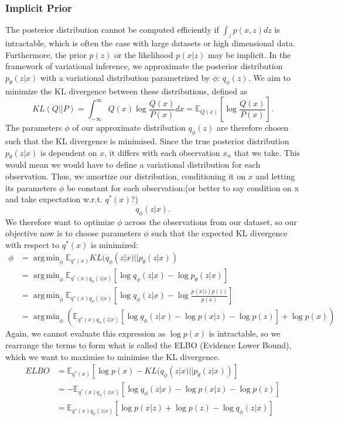 \documentclass[a4paper,12pt]{article}
\DeclareMathOperator*{\argmin}{arg\,min}
\numberwithin{equation}{section}
\begin{document}
\subsubsection{Implicit Prior}
The posterior distribution cannot be computed efficiently if $\int_z p(x,z)dz$ is intractable, which is often the case with large datasets or high dimensional data. Furthermore, the prior $p(z)$ or the likelihood $p(x|z)$ may be implicit. In the framework of variational inference, we approximate the posterior distribution $p_\theta (z|x)$ with a variational distribution parametrized by $\phi$: $q_\phi (z)$. We aim to minimize the KL divergence between these distributions, defined as 
\[KL(Q||P)=\int_{-\infty}^\infty Q(x)\log \frac{Q(x)}{P(x)}dx=\mathbb{E}_{Q(x)}\left[\log\frac{Q(x)}{P(x)}\right].\]
The parameters $\phi$ of our approximate distribution $q_\phi (z)$ are therefore chosen such that the KL divergence is minimised. Since the true posterior distribution $p_\theta(z|x)$ is dependent on $x$, it differs with each observation $x_n$ that we take. This would mean we would have to define a variational distribution for each observation. Thus, we amortize our distribution, conditioning it on $x$ and letting its parameters $\phi$ be constant for each observation:(or better to say condition on x and take expectation w.r.t. $q^*(x)$?)
\[q_\phi(z|x).\]
We therefore want to optimize $\phi$ across the observations from our dataset, so our objective now is to choose parameters $\phi$ such that the expected KL divergence with respect to $q^*(x)$ is minimized:
\begin{align*}
\phi &=\argmin_\phi \mathbb{E}_{q^*(x)}KL(q_\phi(z|x)||p_\theta (z|x))\\
&= \argmin_\phi \mathbb{E}_{q^*(x)q_\phi (z|x)}\left[\log q_\phi(z|x)-\log p_\theta(z|x)\right]\\
&=\argmin_\phi\mathbb{E}_{q^*(x)q_\phi (z|x)}\left[\log q_\phi(z|x)-\log \frac{p(x|z)p(z)}{p(x)}\right]\\
&=\argmin_\phi\left(\mathbb{E}_{q^*(x)q_\phi (z|x)}\left[\log q_\phi(z|x)-\log p(x|z)-\log p(z)\right]+\log p(x)\right)
\end{align*}
Again, we cannot evaluate this expression as $\log p(x)$ is intractable, so we rearrange the terms to form what is called the ELBO (Evidence Lower Bound), which we want to maximise to minimise the KL divergence.
\begin{align*}
ELBO&=\mathbb{E}_{q^*(x)}[\log p(x)-KL(q_\phi(z|x)||p_\theta(z|x))]\\
&=-\mathbb{E}_{q^*(x)q_\phi(z|x)}\left[\log q_\phi(z|x)-\log p(x|z)-\log p(z)\right]\\
&=\mathbb{E}_{q^*(x)q_\phi(z|x)}\left[\log p(x|z)+\log p(z)-\log q_\phi(z|x)\right]
\end{align*}
\end{document}

